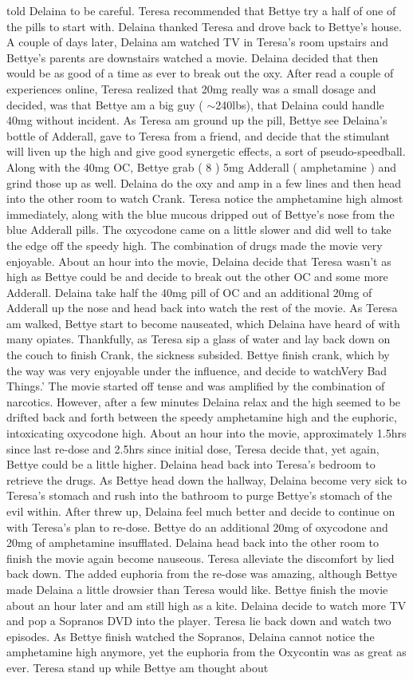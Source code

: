 \documentclass[12pt]{book}
\begin{document}
told Delaina to be careful. Teresa recommended that Bettye try a half of one of the pills to start with. Delaina thanked Teresa and drove back to Bettye's house. A couple of days later, Delaina am watched TV in Teresa's room upstairs and Bettye's parents are downstairs watched a movie. Delaina decided that then would be as good of a time as ever to break out the oxy. After read a couple of experiences online, Teresa realized that 20mg really was a small dosage and decided, was that Bettye am a big guy ( $\sim$240lbs), that Delaina could handle 40mg without incident. As Teresa am ground up the pill, Bettye see Delaina's bottle of Adderall, gave to Teresa from a friend, and decide that the stimulant will liven up the high and give good synergetic effects, a sort of pseudo-speedball. Along with the 40mg OC, Bettye grab ( 8 ) 5mg Adderall ( amphetamine ) and grind those up as well. Delaina do the oxy and amp in a few lines and then head into the other room to watch Crank. Teresa notice the amphetamine high almost immediately, along with the blue mucous dripped out of Bettye's nose from the blue Adderall pills. The oxycodone came on a little slower and did well to take the edge off the speedy high. The combination of drugs made the movie very enjoyable. About an hour into the movie, Delaina decide that Teresa wasn't as high as Bettye could be and decide to break out the other OC and some more Adderall. Delaina take half the 40mg pill of OC and an additional 20mg of Adderall up the nose and head back into watch the rest of the movie. As Teresa am walked, Bettye start to become nauseated, which Delaina have heard of with many opiates. Thankfully, as Teresa sip a glass of water and lay back down on the couch to finish Crank, the sickness subsided. Bettye finish crank, which by the way was very enjoyable under the influence, and decide to watchVery Bad Things.' The movie started off tense and was amplified by the combination of narcotics. However, after a few minutes Delaina relax and the high seemed to be drifted back and forth between the speedy amphetamine high and the euphoric, intoxicating oxycodone high. About an hour into the movie, approximately 1.5hrs since last re-dose and 2.5hrs since initial dose, Teresa decide that, yet again, Bettye could be a little higher. Delaina head back into Teresa's bedroom to retrieve the drugs. As Bettye head down the hallway, Delaina become very sick to Teresa's stomach and rush into the bathroom to purge Bettye's stomach of the evil within. After threw up, Delaina feel much better and decide to continue on with Teresa's plan to re-dose. Bettye do an additional 20mg of oxycodone and 20mg of amphetamine insufflated. Delaina head back into the other room to finish the movie again become nauseous. Teresa alleviate the discomfort by lied back down. The added euphoria from the re-dose was amazing, although Bettye made Delaina a little drowsier than Teresa would like. Bettye finish the movie about an hour later and am still high as a kite. Delaina decide to watch more TV and pop a Sopranos DVD into the player. Teresa lie back down and watch two episodes. As Bettye finish watched the Sopranos, Delaina cannot notice the amphetamine high anymore, yet the euphoria from the Oxycontin was as great as ever. Teresa stand up while Bettye am thought about 
\end{document}
